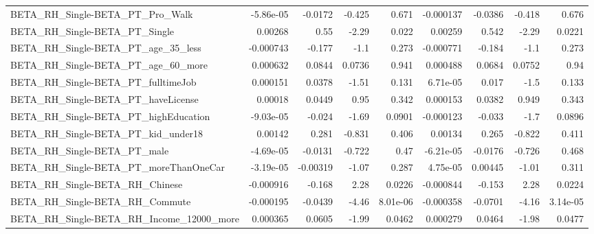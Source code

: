 \begin{tabular}{lrrrrrrrr}
BETA\_RH\_Single-BETA\_PT\_Pro\_Walk                    &   -5.86e-05 &      -0.0172 &    -0.425 &    0.671 &  -0.000137 &     -0.0386 &       -0.418 &         0.676 \\
BETA\_RH\_Single-BETA\_PT\_Single                      &     0.00268 &         0.55 &     -2.29 &    0.022 &    0.00259 &       0.542 &        -2.29 &        0.0221 \\
BETA\_RH\_Single-BETA\_PT\_age\_35\_less                 &   -0.000743 &       -0.177 &      -1.1 &    0.273 &  -0.000771 &      -0.184 &         -1.1 &         0.273 \\
BETA\_RH\_Single-BETA\_PT\_age\_60\_more                 &    0.000632 &       0.0844 &    0.0736 &    0.941 &   0.000488 &      0.0684 &       0.0752 &          0.94 \\
BETA\_RH\_Single-BETA\_PT\_fulltimeJob                 &    0.000151 &       0.0378 &     -1.51 &    0.131 &   6.71e-05 &       0.017 &         -1.5 &         0.133 \\
BETA\_RH\_Single-BETA\_PT\_haveLicense                 &     0.00018 &       0.0449 &      0.95 &    0.342 &   0.000153 &      0.0382 &        0.949 &         0.343 \\
BETA\_RH\_Single-BETA\_PT\_highEducation               &   -9.03e-05 &       -0.024 &     -1.69 &   0.0901 &  -0.000123 &      -0.033 &         -1.7 &        0.0896 \\
BETA\_RH\_Single-BETA\_PT\_kid\_under18                 &     0.00142 &        0.281 &    -0.831 &    0.406 &    0.00134 &       0.265 &       -0.822 &         0.411 \\
BETA\_RH\_Single-BETA\_PT\_male                        &   -4.69e-05 &      -0.0131 &    -0.722 &     0.47 &  -6.21e-05 &     -0.0176 &       -0.726 &         0.468 \\
BETA\_RH\_Single-BETA\_PT\_moreThanOneCar              &   -3.19e-05 &     -0.00319 &     -1.07 &    0.287 &   4.75e-05 &     0.00445 &        -1.01 &         0.311 \\
BETA\_RH\_Single-BETA\_RH\_Chinese                     &   -0.000916 &       -0.168 &      2.28 &   0.0226 &  -0.000844 &      -0.153 &         2.28 &        0.0224 \\
BETA\_RH\_Single-BETA\_RH\_Commute                     &   -0.000195 &      -0.0439 &     -4.46 & 8.01e-06 &  -0.000358 &     -0.0701 &        -4.16 &      3.14e-05 \\
BETA\_RH\_Single-BETA\_RH\_Income\_12000\_more           &    0.000365 &       0.0605 &     -1.99 &   0.0462 &   0.000279 &      0.0464 &        -1.98 &        0.0477 \\

\end{tabular}
